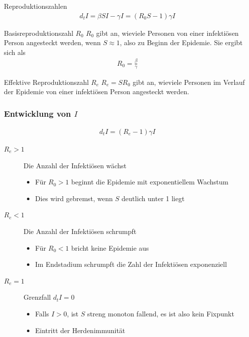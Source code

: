 \begin{frame}{Reproduktionszahlen}
  \begin{gather*}
    d_t I = \beta SI-\gamma I = (R_0S-1) \gamma I
  \end{gather*}
  \begin{block}{Basisreproduktionszahl $R_0$}
    $R_0$ gibt an, wieviele Personen von einer infektiösen Person
    angesteckt werden, wenn $S\approx 1$, also zu Beginn der
    Epidemie. Sie ergibt sich als
    \begin{gather*}
      R_0 = \frac\beta\gamma
    \end{gather*}
  \end{block}

  \begin{block}{Effektive Reproduktionszahl $R_e$}
    $R_e = SR_0$ gibt an, wieviele Personen im Verlauf der Epidemie
    von einer infektiösen Person angesteckt werden.
  \end{block}
\end{frame}

\begin{frame}
  \frametitle<presentation>{Entwicklung von $I$}
  \begin{gather*}
    d_t I = (R_e-1) \gamma I
  \end{gather*}
  \begin{description}
  \item[$R_e>1$] Die Anzahl der Infektiösen wächst
    \begin{itemize}
    \item Für $R_0>1$ beginnt die Epidemie mit exponentiellem Wachstum
    \item Dies wird gebremst, wenn $S$ deutlich unter 1 liegt
    \end{itemize}
  \item[$R_e<1$] Die Anzahl der Infektiösen schrumpft
    \begin{itemize}
    \item Für $R_0<1$ bricht keine Epidemie aus
    \item Im Endstadium schrumpft die Zahl der Infektiösen exponenziell
    \end{itemize}
  \item[$R_e=1$] Grenzfall $d_t I = 0$
    \begin{itemize}
    \item Falls $I>0$, ist $S$ streng monoton fallend, es ist also kein Fixpunkt
    \item Eintritt der \glqq{}Herdenimmunität\grqq{}
    \end{itemize}
  \end{description}
\end{frame}

